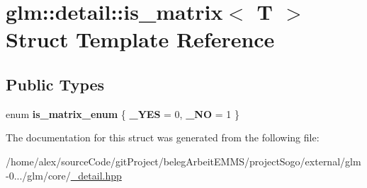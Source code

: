 \hypertarget{structglm_1_1detail_1_1is__matrix}{\section{glm\-:\-:detail\-:\-:is\-\_\-matrix$<$ T $>$ Struct Template Reference}
\label{structglm_1_1detail_1_1is__matrix}
}
\subsection*{Public Types}
\begin{DoxyCompactItemize}
\item 
enum {\bfseries is\-\_\-matrix\-\_\-enum} \{ {\bfseries \-\_\-\-Y\-E\-S} = 0, 
{\bfseries \-\_\-\-N\-O} = 1
 \}
\end{DoxyCompactItemize}


The documentation for this struct was generated from the following file\-:\begin{DoxyCompactItemize}
\item 
/home/alex/source\-Code/git\-Project/beleg\-Arbeit\-E\-M\-M\-S/project\-Sogo/external/glm-\/0.../glm/core/\hyperlink{__detail_8hpp}{\-\_\-detail.\-hpp}\end{DoxyCompactItemize}
